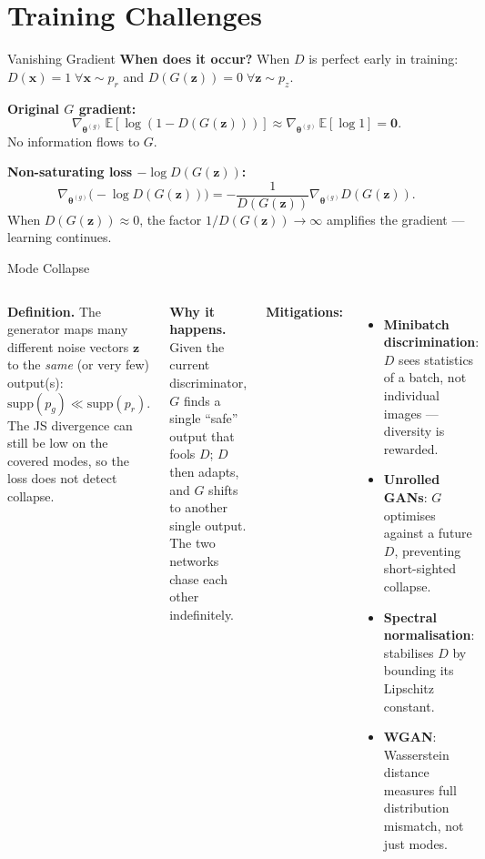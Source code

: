\documentclass[aspectratio=169,11pt]{beamer}
\newcommand{\E}{\mathbb{E}}
\newcommand{\bx}{\bm{x}}
\newcommand{\bz}{\bm{z}}
\newcommand{\btheta}{\bm{\theta}}
\newcommand{\pr}{p_{r}}           %
\newcommand{\pg}{p_{g}}           %
\newcommand{\pz}{p_{z}}           %
\begin{document}
\section{Training Challenges}

\begin{frame}{Vanishing Gradient}
  \textbf{When does it occur?}
  When $D$ is perfect early in training:
  $D(\bx)=1\;\forall\bx\sim\pr$ and $D(G(\bz))=0\;\forall\bz\sim\pz$.

  \medskip
  \textbf{Original $G$ gradient:}
  \[
    \nabla_{\btheta^{(g)}}\,\E[\log(1-D(G(\bz)))]
    \approx \nabla_{\btheta^{(g)}}\,\E[\log 1] = \mathbf{0}.
  \]
  No information flows to $G$.

  \medskip
  \textbf{Non-saturating loss $-\log D(G(\bz))$:}
  \[
    \nabla_{\btheta^{(g)}}\bigl(-\log D(G(\bz))\bigr)
    = -\frac{1}{D(G(\bz))}\nabla_{\btheta^{(g)}}D(G(\bz)).
  \]
  When $D(G(\bz))\approx 0$, the factor $1/D(G(\bz))\to\infty$ amplifies the gradient
  — learning continues.
\end{frame}

\begin{frame}{Mode Collapse}
  \begin{columns}[T]
      \textbf{Definition.} The generator maps many different noise vectors
      $\bz$ to the \emph{same} (or very few) output(s):
      \[
        \mathrm{supp}(\pg) \ll \mathrm{supp}(\pr).
      \]
      The JS divergence can still be low on the covered modes,
      so the loss does not detect collapse.

      \medskip
      \textbf{Why it happens.} Given the current discriminator,
      $G$ finds a single ``safe'' output that fools $D$;
      $D$ then adapts, and $G$ shifts to another single output.
      The two networks chase each other indefinitely.

      \textbf{Mitigations:}
      \begin{itemize}
        \item \textbf{Minibatch discrimination}: $D$ sees statistics of a
              batch, not individual images — diversity is rewarded.
        \item \textbf{Unrolled GANs}: $G$ optimises against a future $D$,
              preventing short-sighted collapse.
        \item \textbf{Spectral normalisation}: stabilises $D$ by bounding
              its Lipschitz constant.
        \item \textbf{WGAN}: Wasserstein distance measures full distribution
              mismatch, not just modes.
      \end{itemize}
  \end{columns}
\end{frame}
\end{document}
